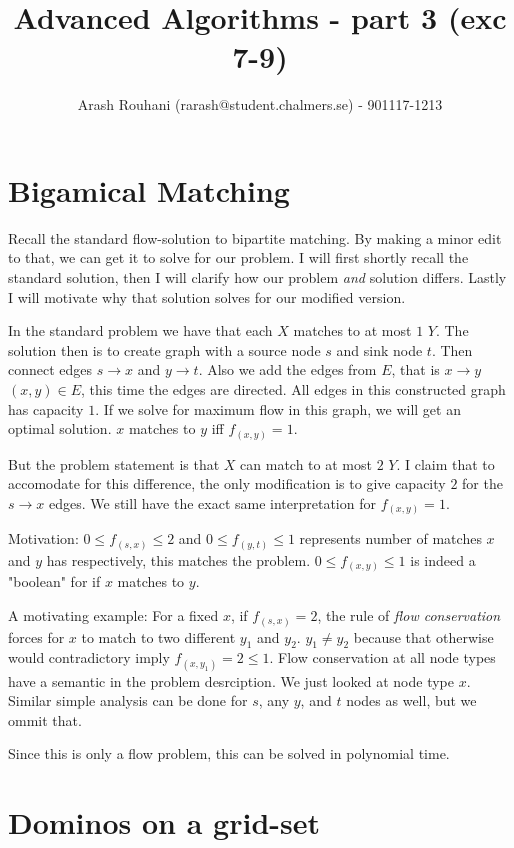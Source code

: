 \documentclass[a4paper,11pt]{article}
\title{Advanced Algorithms - part 3 (exc 7-9)}
\author{Arash Rouhani (rarash@student.chalmers.se) - 901117-1213}
\begin{document}
\maketitle


\section{Bigamical Matching}

Recall the standard flow-solution to bipartite matching.
By making a minor edit to that, we can get it to solve for our problem.
I will first shortly recall the standard solution, then I will
clarify how our problem \emph{and} solution differs.
Lastly I will motivate why that solution solves for our modified version.

In the standard problem we have that each $X$ matches to at most $1$ $Y$.
The solution then is to create graph with a source node $s$ and
sink node $t$. Then connect edges $s \to x$ and $y \to t$. Also
we add the edges from $E$, that is $x \to y$ $(x,y) \in E$,
this time the edges are directed. All edges in this constructed graph
has capacity $1$.
If we solve for maximum flow in this graph, we will get an optimal
solution. $x$ matches to $y$ iff $f_{(x,y)} = 1$.

But the problem statement is that $X$ can match to at most $2$ $Y$.
I claim that to accomodate for this difference, the only modification
is to give capacity $2$ for the $s \to x$ edges.
We still have the exact same interpretation for $f_{(x,y)} = 1$.

Motivation: $0 \leq f_{(s, x)} \leq 2$ and $0 \leq f_{(y, t)} \leq 1$
represents number of matches $x$ and $y$ has respectively,
this matches the problem. $0 \leq f_{(x, y)} \leq 1$ is indeed
a "boolean" for if $x$ matches to $y$.

A motivating example: For a fixed
$x$, if $f_{(s, x)} = 2$, the rule of \emph{flow conservation}
forces for $x$ to match to two different $y_1$ and $y_2$.
$y_1 \neq y_2$ because that otherwise would contradictory imply
$f_{(x, y_1)} = 2 \leq 1$. Flow conservation
at all node types have a semantic in the problem desrciption.
We just looked at node type $x$. Similar simple analysis
can be done for $s$, any $y$, and $t$ nodes as well,
but we ommit that.

Since this is only a flow problem, this can be solved
in polynomial time.

\section{Dominos on a grid-set}
\end{document}

